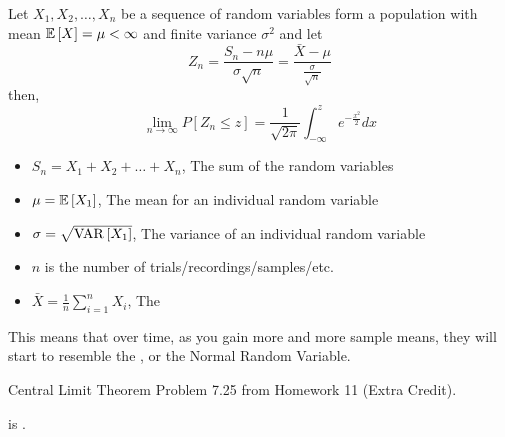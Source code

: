 		\begin{theorem} \label{thm:Central Limit Theorem}
			Let $X_{1},X_{2},\ldots,X_{n}$ be a sequence of  random variables form a population with mean $\operatorname{\operatorname{\mathbb{E}}} \left[ X \right] = \mu < \infty$ and finite variance $\sigma^{2}$ and let
			\begin{equation*}
				Z_{n} = \frac{S_{n} - n\mu}{\sigma \sqrt{n}} = \frac{\bar{X} - \mu}{\frac{\sigma}{\sqrt{n}}}
			\end{equation*}
			then,
			\begin{equation} \label{eq:Central Limit Theorem}
				\lim\limits_{n \rightarrow \infty} P \left[ Z_{n} \leq z \right] = \frac{1}{\sqrt{2 \pi}} \int_{-\infty}^{z} e^{-\frac{x^{2}}{2}} dx
			\end{equation}
			\begin{itemize} %
				\item $S_{n}=X_{1}+X_{2}+\ldots+X_{n}$, The sum of the random variables
				\item $\mu=\operatorname{\operatorname{\mathbb{E}}} \left[ X_{1} \right]$, The mean for an individual random variable
				\item $\sigma=\sqrt{\operatorname{\operatorname{VAR}} \left[ X_{1} \right]}$, The variance of an individual random variable
				\item $n$ is the number of trials/recordings/samples/etc.
				\item $\bar{X} = \frac{1}{n} \sum\limits_{i=1}^{n} X_{i}$, The 
			\end{itemize}
			\begin{remark*}
				This means that over time, as you gain more and more sample means, they will start to resemble the , or the Normal Random Variable.
			\end{remark*}
		\end{theorem}
		\begin{example}[Problem 7.25]{Central Limit Theorem} 
			Problem 7.25 from Homework 11 (Extra Credit).
		\end{example}
	
		 is .
